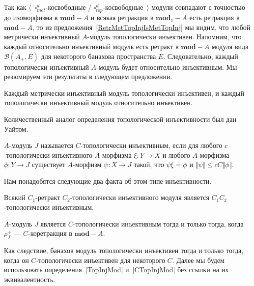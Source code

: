 Так как $\langle$~$\square_{met}^d$-косвободные /
$\square_{top}^d$-косвободные~$\rangle$ модули совпадают с точностью до
изоморфизма в $\mathbf{mod}-A$ и всякая ретракция в $\mathbf{mod}_1-A$ есть
ретракция в $\mathbf{mod}-A$, то из предложения~\ref{RetrMetTopInjIsMetTopInj}
мы видим, что любой метрически инъективный $A$-модуль топологически инъективен.
Напомним, что каждый относительно инъективный модуль есть ретракт в
$\mathbf{mod}-A$ модуля вида $\mathcal{B}(A_+,E)$ для некоторого банахова
пространства $E$. Следовательно, каждый топологически инъективный $A$-модуль
будет относительно инъективным. Мы резюмируем эти результаты в следующем
предложении.

\begin{proposition}\label{MetInjIsTopInjAndTopInjIsRelInj} Каждый метрически
инъективный модуль топологически инъективен, и каждый топологически инъективный
модуль относительно инъективен.
\end{proposition}

Количественный аналог определения топологической инъективности был дан Уайтом.

\begin{definition}\label{CTopInjMod}
$A$-модуль $J$ называется $C$-топологически инъективным, если для любого
$c$-топологически инъективного $A$-морфизма $\xi:Y\to X$ и любого $A$-морфизма
$\phi:Y\to J$ существует $A$-морфизм $\psi:X\to J$ такой, что $\psi\xi=\phi$ и
$\Vert\psi\Vert\leq cC\Vert\phi\Vert$.
\end{definition}

Нам понадобятся следующие два факта об этом типе инъективности.

\begin{proposition}\label{RetrCTopInjIsCTopInj} Всякий $C_1$-ретракт $C_2$-топологически
инъективного модуля является $C_1C_2$-топологически инъективным.
\end{proposition}

\begin{proposition}\label{CTopInjModViaCanonicMorph} $A$-модуль $J$ является $C$-топологически
инъективным тогда и только тогда, когда $\rho_J^+$ --- $C$-коретракция в
$\mathbf{mod}-A$.
\end{proposition}

Как следствие, банахов модуль топологически инъективен тогда и только тогда,
когда он $C$-топологически инъективен для некоторого $C$. Далее мы будем
использовать определения~\ref{TopInjMod} и~\ref{CTopInjMod} без ссылки на их
эквивалентность.

